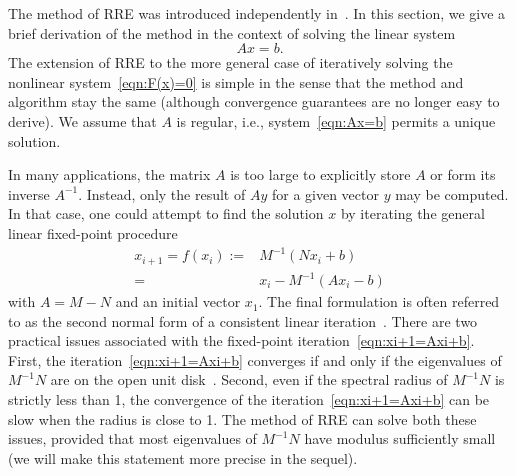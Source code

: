 The method of \ac{RRE} was introduced independently
in~\cite{eddy1979extrapolating, kaniel1974least, mevsina1977convergence}.
In this section, we give a brief derivation of the method in the context of solving the linear system
\begin{equation}
	A x = b.
	\label{eqn:Ax=b}
\end{equation}
The extension of \ac{RRE} to the more general case of iteratively solving the nonlinear system~\eqref{eqn:F(x)=0} is simple in the sense that the method and algorithm stay the same (although convergence guarantees are no longer easy to derive).
We assume that $A$ is regular,
i.e., system~\eqref{eqn:Ax=b} permits a unique solution.

In many applications, the matrix $A$ is too large to explicitly store $A$
or form its inverse $A^{-1}$.
Instead, only the result of $Ay$
for a given vector $y$ may be computed.
In that case, one could attempt to find the solution $x$
by iterating the general linear fixed-point procedure
\begin{equation}
\begin{aligned}
	x_{i+1} = f(x_i)
	:={}& M^{-1} (N x_i + b) \\
	={}& x_i - M^{-1} (Ax_i - b)
\end{aligned}
\label{eqn:xi+1=Axi+b}
\end{equation}
with $A = M - N$ and an initial vector $x_1$.
The final formulation is often referred to as the second normal form of a consistent linear iteration~\cite[Section~2.2.2]{Hac16}.
There are two practical issues associated with the fixed-point iteration~\eqref{eqn:xi+1=Axi+b}.
First, the iteration~\eqref{eqn:xi+1=Axi+b} converges if and only if the eigenvalues of $M^{-1}N$ are on the open unit disk~\cite[Section~11.2.3]{golub2013matrix}.
Second, even if the spectral radius of $M^{-1}N$ is strictly less than 1, the
convergence of the iteration~\eqref{eqn:xi+1=Axi+b} can be slow when the radius
is close to 1.
The method of \ac{RRE} can solve both these issues, provided that most eigenvalues of $M^{-1}N$ have modulus sufficiently small (we will make this statement more precise in the sequel).

